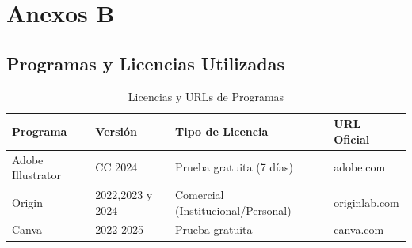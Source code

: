 \documentclass[12pt]{article}
\begin{document}

\begin{table}[h]
\section{Anexos B}
\label{chap:anexo5}
\subsection*{Programas y Licencias Utilizadas}
    \centering
    \caption{Licencias y URLs de Programas}
    \begin{tabular}{|l|l|l|l|}
    \hline
    \textbf{Programa} & \textbf{Versión} & \textbf{Tipo de Licencia} & \textbf{URL Oficial} \\ \hline
    Adobe Illustrator & CC 2024         & Prueba gratuita (7 días)  & adobe.com           \\ \hline
    Origin            & 2022,2023 y 2024            & Comercial (Institucional/Personal) & originlab.com    \\ \hline    Canva & 2022-2025         & Prueba gratuita  & canva.com           \\ \hline
    \end{tabular}
    
    \label{tab:programas}
\end{table}
\end{document}

